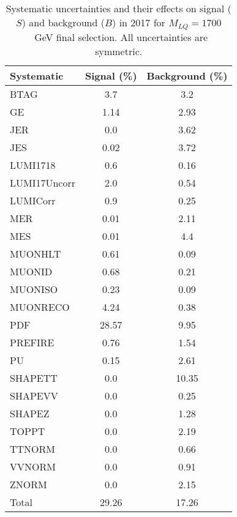 \begin{table}[htbp]
\begin{center}
\caption{Systematic uncertainties and their effects on signal ($S$) and background ($B$) in 2017 for $M_{LQ}=1700$~GeV final selection. All uncertainties are symmetric.}
\begin{tabular}{lcc}
\hline\hline
Systematic & Signal (\%) & Background (\%) \\ \hline 
BTAG & 3.7 & 3.2\\ 
GE & 1.14 & 2.93\\ 
JER & 0.0 & 3.62\\ 
JES & 0.02 & 3.72\\ 
LUMI1718 & 0.6 & 0.16\\ 
LUMI17Uncorr & 2.0 & 0.54\\ 
LUMICorr & 0.9 & 0.25\\ 
MER & 0.01 & 2.11\\ 
MES & 0.01 & 4.4\\ 
MUONHLT & 0.61 & 0.09\\ 
MUONID & 0.68 & 0.21\\ 
MUONISO & 0.23 & 0.09\\ 
MUONRECO & 4.24 & 0.38\\ 
PDF & 28.57 & 9.95\\ 
PREFIRE & 0.76 & 1.54\\ 
PU & 0.15 & 2.61\\ 
SHAPETT & 0.0 & 10.35\\ 
SHAPEVV & 0.0 & 0.25\\ 
SHAPEZ & 0.0 & 1.28\\ 
TOPPT & 0.0 & 2.19\\ 
TTNORM & 0.0 & 0.66\\ 
VVNORM & 0.0 & 0.91\\ 
ZNORM & 0.0 & 2.15\\ 
Total & 29.26 & 17.26\\ \hline \hline
\end{tabular}
\label{tab:SysUncertainties_uujj_1700}
\end{center}
\end{table}

